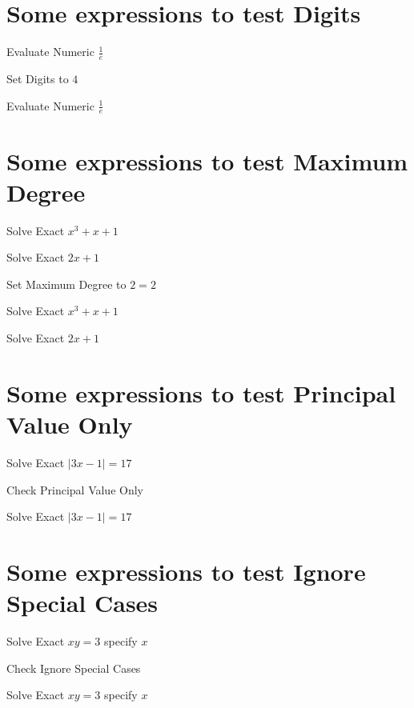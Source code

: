 \documentclass{article}
\begin{document}
\section{Some expressions to test Digits}

Evaluate Numeric $\frac{1}{e}$

Set Digits to $4$

Evaluate Numeric $\frac{1}{e}$

\section{Some expressions to test Maximum Degree}

Solve Exact $x^{3}+x+1$

Solve Exact $2x+1$

Set Maximum Degree to $2=\allowbreak 2$

Solve Exact $x^{3}+x+1$

Solve Exact $2x+1$

\section{Some expressions to test Principal Value Only}

Solve Exact $\left\vert 3x-1\right\vert =17$

Check Principal Value Only

Solve Exact $\left\vert 3x-1\right\vert =17$

\section{Some expressions to test Ignore Special Cases}

Solve Exact $xy=3$ specify $x$

Check Ignore Special Cases

Solve Exact $xy=3$ specify $x$
\end{document}

